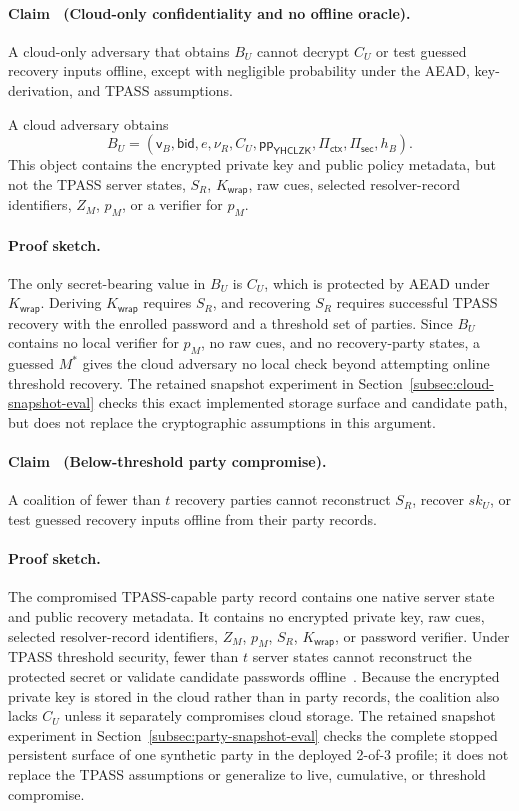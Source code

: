 \documentclass[sigconf,anonymous]{acmart}
\newcommand{\YHCLZK}{\mathsf{YHCLZK}}
\newcounter{locusclaim}
\newcommand{\locusclaim}[1]{\refstepcounter{locusclaim}\paragraph{Claim \thelocusclaim\ (#1).}}
\newcommand{\proofsketch}{\paragraph{Proof sketch.}}
\begin{document}
\locusclaim{Cloud-only confidentiality and no offline oracle}
\label{claim:cloud-only}
A cloud-only adversary that obtains \(B_U\) cannot decrypt \(C_U\) or test guessed recovery inputs offline, except with negligible probability under the AEAD, key-derivation, and TPASS assumptions.

A cloud adversary obtains
\[
B_U =
(
\mathsf{v}_B,
\mathsf{bid},
e,
\nu_R,
C_U,
\mathsf{pp}_{\YHCLZK},
\Pi_{\mathsf{ctx}},
\Pi_{\mathsf{sec}},
h_B
).
\]
This object contains the encrypted private key and public policy metadata, but not the TPASS server states, \(S_R\), \(K_{\mathsf{wrap}}\), raw cues, selected resolver-record identifiers, \(Z_M\), \(p_M\), or a verifier for \(p_M\).

\proofsketch
The only secret-bearing value in \(B_U\) is \(C_U\), which is protected by AEAD under \(K_{\mathsf{wrap}}\). Deriving \(K_{\mathsf{wrap}}\) requires \(S_R\), and recovering \(S_R\) requires successful TPASS recovery with the enrolled password and a threshold set of parties. Since \(B_U\) contains no local verifier for \(p_M\), no raw cues, and no recovery-party states, a guessed \(M^\ast\) gives the cloud adversary no local check beyond attempting online threshold recovery. The retained snapshot experiment in Section~\ref{subsec:cloud-snapshot-eval} checks this exact implemented storage surface and candidate path, but does not replace the cryptographic assumptions in this argument.

\locusclaim{Below-threshold party compromise}
\label{claim:below-threshold}
A coalition of fewer than \(t\) recovery parties cannot reconstruct \(S_R\), recover \(sk_U\), or test guessed recovery inputs offline from their party records.

\proofsketch
The compromised TPASS-capable party record contains one native server state and public recovery metadata. It contains no encrypted private key, raw cues, selected resolver-record identifiers, \(Z_M\), \(p_M\), \(S_R\), \(K_{\mathsf{wrap}}\), or password verifier. Under TPASS threshold security, fewer than \(t\) server states cannot reconstruct the protected secret or validate candidate passwords offline~\cite{Yi2015TPASS,Yi2019TPASS}. Because the encrypted private key is stored in the cloud rather than in party records, the coalition also lacks \(C_U\) unless it separately compromises cloud storage. The retained snapshot experiment in Section~\ref{subsec:party-snapshot-eval} checks the complete stopped persistent surface of one synthetic party in the deployed 2-of-3 profile; it does not replace the TPASS assumptions or generalize to live, cumulative, or threshold compromise.
\end{document}
